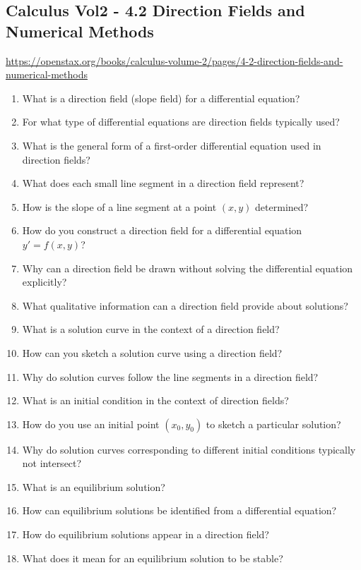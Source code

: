 \subsection{Calculus Vol2 - 4.2 Direction Fields and Numerical Methods}

\url{https://openstax.org/books/calculus-volume-2/pages/4-2-direction-fields-and-numerical-methods}

\begin{enumerate}
  \item What is a direction field (slope field) for a differential equation?
  \item For what type of differential equations are direction fields typically used?
  \item What is the general form of a first-order differential equation used in direction fields?
  \item What does each small line segment in a direction field represent?
  \item How is the slope of a line segment at a point \((x,y)\) determined?
  \item How do you construct a direction field for a differential equation \(y' = f(x,y)\)?
  \item Why can a direction field be drawn without solving the differential equation explicitly?
  \item What qualitative information can a direction field provide about solutions?
  \item What is a solution curve in the context of a direction field?
  \item How can you sketch a solution curve using a direction field?
  \item Why do solution curves follow the line segments in a direction field?
  \item What is an initial condition in the context of direction fields?
  \item How do you use an initial point \((x_{0},y_{0})\) to sketch a particular solution?
  \item Why do solution curves corresponding to different initial conditions typically not intersect?
  \item What is an equilibrium solution?
  \item How can equilibrium solutions be identified from a differential equation?
  \item How do equilibrium solutions appear in a direction field?
  \item What does it mean for an equilibrium solution to be stable?

\end{enumerate}
